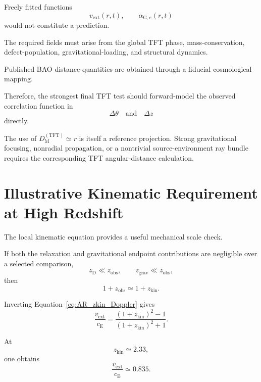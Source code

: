 Freely fitted functions
\begin{equation}
    v_{\mathrm{ext}}(r,t),
    \qquad
    \alpha_{\mathrm G,e}(r,t)
\end{equation}
would not constitute a prediction.

The required fields must arise from the global TFT phase, mass-conservation,
defect-population, gravitational-loading, and structural dynamics.

Published BAO distance quantities are obtained through a fiducial
cosmological mapping.

Therefore, the strongest final TFT test should forward-model the observed
correlation function in
\begin{equation}
    \Delta\theta
    \quad\text{and}\quad
    \Delta z
\end{equation}
directly.

The use of \(D_{\mathrm M}^{(\mathrm{TFT})}\simeq r\) is itself a reference
projection. Strong gravitational focusing, nonradial propagation, or a
nontrivial source-environment ray bundle requires the corresponding TFT
angular-distance calculation.


\section{Illustrative Kinematic Requirement at High Redshift}

The local kinematic equation provides a useful mechanical scale check.

If both the relaxation and gravitational endpoint contributions are
negligible over a selected comparison,
\begin{equation}
    z_{\mathrm D}
    \ll
    z_{\mathrm{obs}},
    \qquad
    z_{\mathrm{grav}}
    \ll
    z_{\mathrm{obs}},
\end{equation}
then
\begin{equation}
    1+z_{\mathrm{obs}}
    \simeq
    1+z_{\mathrm{kin}}.
\end{equation}

Inverting Equation~\eqref{eq:AR_zkin_Doppler} gives
\begin{equation}
    \boxed{
    \frac{
        v_{\mathrm{ext}}
    }{
        c_{\mathrm E}
    }
    =
    \frac{
        (1+z_{\mathrm{kin}})^2-1
    }{
        (1+z_{\mathrm{kin}})^2+1
    }.
    }
    \label{eq:AR_beta_inverse}
\end{equation}

At
\begin{equation}
    z_{\mathrm{kin}}
    \simeq
    2.33,
\end{equation}
one obtains
\begin{equation}
    \frac{
        v_{\mathrm{ext}}
    }{
        c_{\mathrm E}
    }
    \simeq
    0.835.
    \label{eq:AR_beta_233}
\end{equation}

